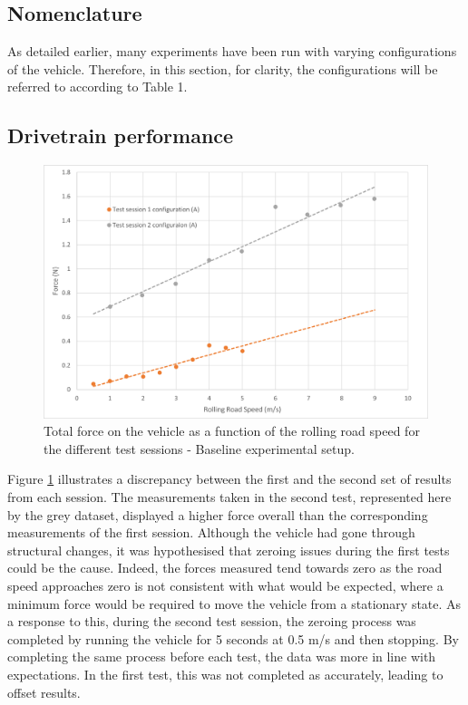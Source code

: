 \subsection{Nomenclature}

As detailed earlier, many experiments have been run with varying configurations of the vehicle. Therefore, in this section, for clarity, the configurations will be referred to according to Table 1.



\subsection{Drivetrain performance}

\begin{figure}
    \centering
    \includegraphics[width = 0.7\linewidth]{images/part11/zeroingcomparison.png}
    \caption{Total force on the vehicle as a function of the rolling road speed for the different test sessions - Baseline experimental setup.}
    \label{fig:zeroing}
\end{figure}

Figure \ref{fig:zeroing} illustrates a discrepancy between the first and the second set of results from each session. The measurements taken in the second test, represented here by the grey dataset, displayed a higher force overall than the corresponding measurements of the first session. Although the vehicle had gone through structural changes, it was hypothesised that zeroing issues during the first tests could be the cause. Indeed, the forces measured tend towards zero as the road speed approaches zero is not consistent with what would be expected, where a minimum force would be required to move the vehicle from a stationary state. As a response to this, during the second test session, the zeroing process was completed by running the vehicle for 5 seconds at 0.5 m/s and then stopping. By completing the same process before each test, the data was more in line with expectations. In the first test, this was not completed as accurately, leading to offset results.

